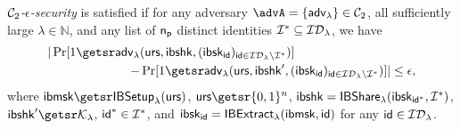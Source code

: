 \begin{definition}
	\emph{$\mathcal{C}_2$-$\epsilon$-security} is satisfied if for any adversary $\advA = \{\adv\} \in \cc_2$, all sufficiently large $\lambda \in \mathbb{N}$, and any list of $\mathsf{n_p}$ distinct identities $\mathcal{I}^* \subseteq \mathcal{ID}_{\lambda}$, we have
	\[\begin{split}
		|\Pr[1 \getsr \adv&(\urs,\ibshk,(\ibsk_{\ibid})_{\ibid\in\mathcal{ID}_{\lambda}\backslash\ibidlist^*})] \\-& \Pr[1\getsr \adv(\urs,\ibshk^{\prime},(\ibsk_{\ibid})_{\ibid\in\mathcal{ID}_{\lambda}\backslash\ibidlist^*})]| \leq \epsilon,
	\end{split}\]
	where $\ibmsk \getsr \ibsetup(\urs)$, $\urs \getsr \bin^{n}$, $\mathsf{ibshk} = \mathsf{IBShare}_{\lambda}(\mathsf{ibsk}_{\mathsf{id}^*}, \mathcal{I}^*)$, $\ibshk^{\prime} \getsr \ibshkspace$, $\mathsf{id}^* \in \mathcal{I}^*$, and $\mathsf{ibsk}_{\mathsf{id}} = \mathsf{IBExtract}_{\lambda}(\mathsf{ibmsk}, \mathsf{id})$ for any $\mathsf{id} \in \mathcal{ID}_{\lambda}$.
	

\end{definition}
